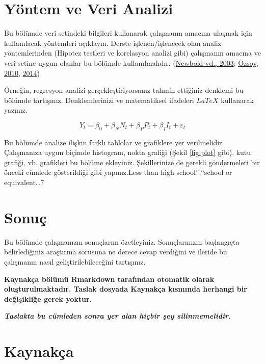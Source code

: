 \documentclass[
  12pt,
]{article}
\begin{document}
\hypertarget{yuxf6ntem-ve-veri-analizi}{%
\section{Yöntem ve Veri Analizi}\label{yuxf6ntem-ve-veri-analizi}}

Bu bölümde veri setindeki bilgileri kullanarak çalışmanın amacına ulaşmak için kullanılacak yöntemleri açıklayın. Derste işlenen/işlenecek olan analiz yöntemlerinden (Hipotez testleri ve korelasyon analizi gibi) çalışmanın amacına ve veri setine uygun olanlar bu bölümde kullanılmalıdır. (\protect\hyperlink{ref-newbold:2003}{Newbold vd., 2003}; \protect\hyperlink{ref-ozsoy:2010}{Özsoy, 2010}, \protect\hyperlink{ref-ozsoy:2014}{2014})

Örneğin, regresyon analizi gerçekleştiriyorsanız tahmin ettiğiniz denklemi bu bölümde tartışınız. Denklemlerinizi ve matematiksel ifadeleri \(LaTeX\) kullanarak yazınız.

\[
Y_t = \beta_0 + \beta_N N_t + \beta_P P_t + \beta_I I_t + \varepsilon_t
\]

Bu bölümde analize ilişkin farklı tablolar ve grafiklere yer verilmelidir. Çalışmanıza uygun biçimde histogram, nokta grafiği (Şekil \ref{fig:plot} gibi), kutu grafiği, vb. grafikleri bu bölüme ekleyiniz. Şekillerinize de gerekli göndermeleri bir önceki cümlede gösterildiği gibi yapınız.Less than high school'',``\nHigh school or equivalent\ldots7

\hypertarget{sonuuxe7}{%
\section{Sonuç}\label{sonuuxe7}}

Bu bölümde çalışmanızın sonuçlarını özetleyiniz. Sonuçlarınızın başlangıçta belirlediğiniz araştırma sorusuna ne derece cevap verdiğini ve ileride bu çalışmanın nasıl geliştirilebileceğini tartışınız.

\textbf{Kaynakça bölümü Rmarkdown tarafından otomatik olarak oluşturulmaktadır. Taslak dosyada Kaynakça kısmında herhangi bir değişikliğe gerek yoktur.}

\textbf{\emph{Taslakta bu cümleden sonra yer alan hiçbir şey silinmemelidir.}}

\newpage

\hypertarget{references}{%
\section{Kaynakça}\label{references}}
\end{document}
